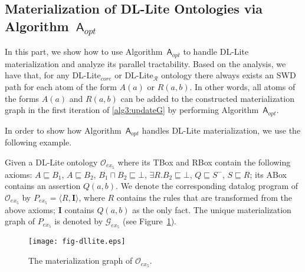 \documentclass[final,1p,times]{elsarticle}
\begin{document}
\subsection{Materialization of DL-Lite Ontologies via Algorithm~$\mathsf{A}_{opt}$}

In this part, we show how to use Algorithm~$\mathsf{A}_{opt}$ to handle
DL-Lite materialization and analyze its parallel tractability.
Based on the analysis, we have that, for any DL-Lite$_{core}$ or DL-Lite$_\mathcal{R}$ ontology
there always exists an SWD path for each atom of the form $A(a)$ or $R(a,b)$.
In other words, all atoms of the forms $A(a)$ and $R(a,b)$ can be added to
the constructed materialization graph in the first iteration of \ref{alg3:updateG}
by performing Algorithm~$\mathsf{A}_{opt}$.

In order to show how Algorithm~$\mathsf{A}_{opt}$ handles DL-Lite materialization,
we use the following example.

\begin{example}\label{exp:dllite}
Given a DL-Lite ontology $\mathcal{O}_{ex_5}$
where its TBox and RBox contain the following axioms:
$A\sqsubseteq B_1$, $A\sqsubseteq B_2$, $B_1\sqcap B_2\sqsubseteq\bot$,
$\exists R.B_2\sqsubseteq\bot$, $Q\sqsubseteq S^-$, $S\sqsubseteq R$;
its ABox contains an assertion $Q(a,b)$.
We denote the corresponding datalog program of $\mathcal{O}_{ex_5}$ by $P_{ex_5}=\langle R, \textbf{I}\rangle$,
where $R$ contains the rules that are transformed from the above axioms; $\textbf{I}$ contains $Q(a,b)$
as the only fact.
The unique materialization graph of $P_{ex_5}$ is denoted by $\mathcal{G}_{ex_5}$ (see Figure~\ref{fig:ex2}).
\end{example}

\begin{figure}[htbp]
\begin{center}
\texttt{[image: fig-dllite.eps]}
\caption{The materialization graph of $\mathcal{O}_{ex_5}$.}
\label{fig:ex2}
\end{center}
\end{figure}
\end{document}
